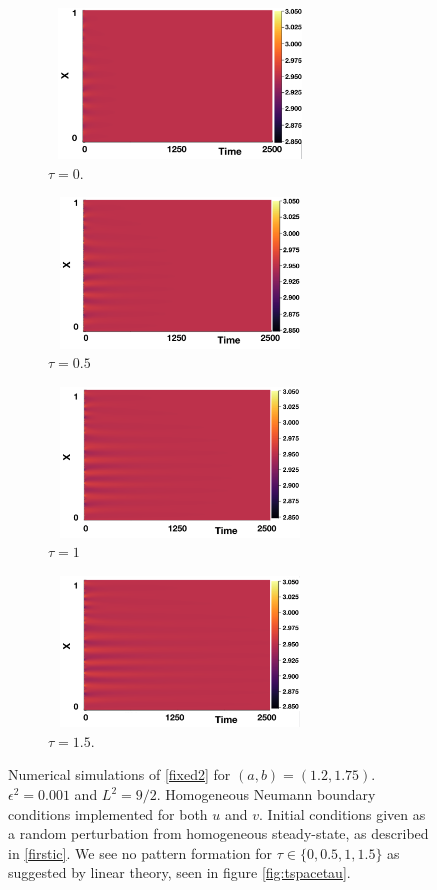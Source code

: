 \begin{figure}[H]
    \centering
    \begin{subfigure}[b]{0.45\textwidth}
        \centering
        \includegraphics[width=7cm,height=4cm]{p3t0.png}
        \caption{$\tau=0$.}
        \label{}
    \end{subfigure}
    \hfill
    \begin{subfigure}[b]{0.45\textwidth}
        \centering
        \includegraphics[width=7cm,height=4cm]{p3t05.png}
        \caption{$\tau=0.5$}
        \label{}
    \end{subfigure}
    \hfill
    \begin{subfigure}[b]{0.45\textwidth}
        \centering
        \includegraphics[width=7cm,height=4cm]{p3t1.png}
        \caption{$\tau=1$}
        \label{}
    \end{subfigure}
    \hfill
    \begin{subfigure}[b]{0.45\textwidth}
        \centering
        \includegraphics[width=7cm,height=4cm]{p3t15.png}
        \caption{$\tau=1.5$.}
        \label{}
    \end{subfigure}
    \caption{Numerical simulations of \eqref{fixed2} for $(a,b)=(1.2,1.75)$. $\epsilon^2=0.001$ and $L^2=9/2$. Homogeneous Neumann boundary conditions implemented for both $u$ and $v$. Initial conditions given as a random perturbation from homogeneous steady-state, as described in \eqref{firstic}. We see no pattern formation for $\tau\in\{0,0.5,1,1.5\}$ as suggested by linear theory, seen in figure \ref{fig:tspacetau}.}
    \label{fig:testturing2}
\end{figure}

